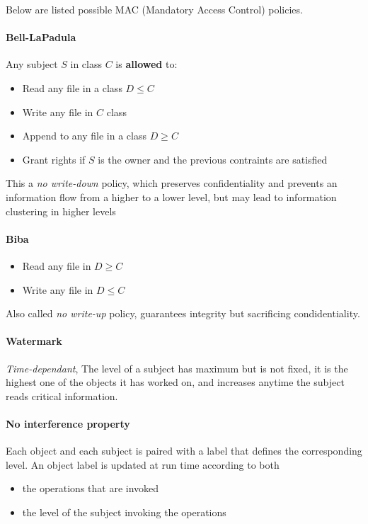 Below are listed possible MAC (Mandatory Access Control) policies.
\paragraph{Bell-LaPadula}
Any subject $S$ in class $C$ is \textbf{allowed} to:
\begin{itemize}
    \item Read any file in a class $D \leq C$
    \item Write any file in $C$ class
    \item Append to any file in a class $D \geq C$
    \item Grant rights if $S$ is the owner and the previous contraints are satisfied
\end{itemize}
This a \textit{no write-down} policy, 
which preserves confidentiality and prevents an information flow from a higher to a lower level,
but may lead to information clustering in higher levels

\paragraph{Biba}
\begin{itemize}
    \item Read any file in $D \geq C$
    \item Write any file in $D \leq C$
\end{itemize}

Also called \textit{no write-up} policy, guarantees integrity but sacrificing condidentiality.

\paragraph{Watermark}
\textit{Time-dependant}, The level of a subject has maximum but is not fixed, it is the
highest one of the objects it has worked on, and increases anytime the
subject reads critical information.

\paragraph{No interference property}
Each object and each subject is paired with a label that
defines the corresponding level.
An object label is updated at run time according to both
\begin{itemize}
    \item the operations that are invoked
    \item the level of the subject invoking the operations
\end{itemize}

